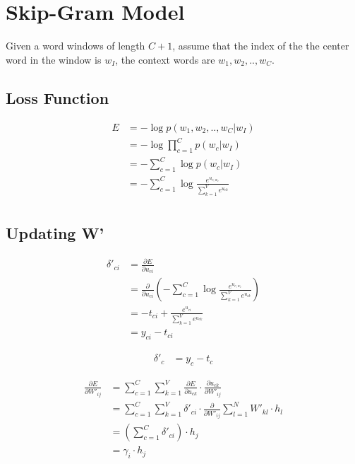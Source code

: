 \documentclass{article}
\begin{document}
	\section{Skip-Gram Model}
	Given a word windows of length $C+1$, assume that the index of the the center word in the window is $w_I$, the context words are $w_1, w_2, .., w_C$.
	\subsection{Loss Function}
	\begin{equation}
		\begin{aligned}
			E &=-\log p(w_{1}, w_{2}, .., w_{C}|w_{I})\\ 
			&= -\log \prod_{c=1}^{C} p(w_{c}|w_{I}) \\
			&= -\sum_{c=1}^{C} \log p(w_{c}|w_{I}) \\ 
			&= -\sum_{c=1}^{C} \log \frac{e^{u_{c,w_c}}}{\sum_{k=1}^{V}e^{u_{ck}}} \\ 
		\end{aligned}
	\end{equation}
	
	\subsection{Updating W'}
	\begin{equation}
		\begin{aligned}
			\delta'_{ci} &= \frac{\partial E}{\partial u_{ci}} \\
			&= \frac{\partial}{\partial u_{ci}} \left(
			-\sum_{c=1}^{C} \log \frac{e^{u_{c,w_c}}}{\sum_{k=1}^{V}e^{u_{ck}}} \right) \\
			&= -t_{ci} + \frac{e^{u_{ci}}}{\sum_{k=1}^{V}e^{u_{ck}}} \\
			&= y_{ci} - t_{ci}
		\end{aligned}
	\end{equation}
	
	\begin{equation}
		\begin{aligned}
			\delta'_{c} &= y_{c} - t_{c} 
		\end{aligned}
	\end{equation}

	\begin{equation}
		\begin{aligned}
			\frac{\partial E}{\partial W'_{ij}} &= \sum_{c=1}^{C} \sum_{k=1}^{V} \frac{\partial E}{\partial u_{ck}} \cdot \frac{\partial u_{ck}}{\partial W'_{ij}} \\
			&= \sum_{c=1}^{C} \sum_{k=1}^{V} \delta'_{ci} \cdot \frac{\partial}{\partial W'_{ij}}\sum_{l=1}^{N} W'_{kl} \cdot h_l \\
			&= \left(\sum_{c=1}^{C} \delta'_{ci} \right)\cdot h_j \\
			&= \gamma_i \cdot h_j
		\end{aligned}	
	\end{equation}
	
\end{document}

